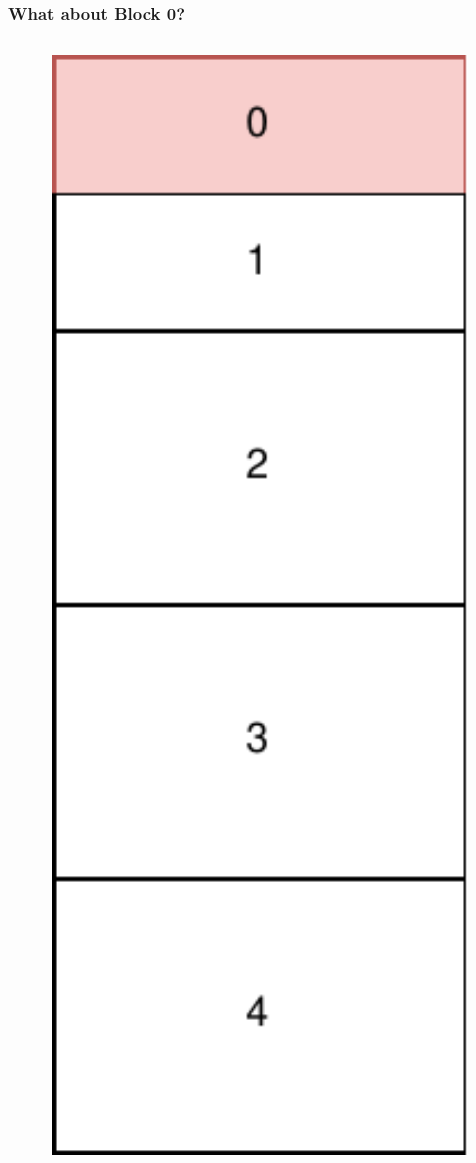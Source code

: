 \documentclass[aspectratio=169]{beamer}
\begin{document}
\begin{frame}
	\frametitle{What about Block 0?}

	\begin{columns}
		\begin{column}{0.2\textwidth}
			\includegraphics[width=1.0\textwidth]{block0.pdf}

\end{column}
\end{columns}
\end{frame}
\end{document}
